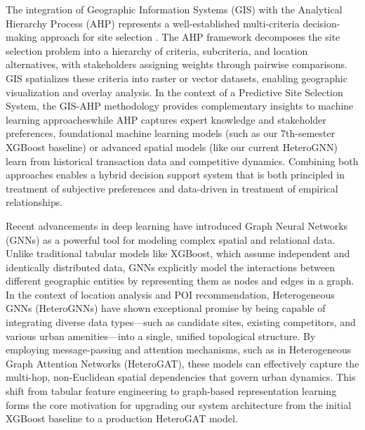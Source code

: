 \par The integration of Geographic Information Systems (GIS) with the Analytical Hierarchy Process (AHP) represents a well-established multi-criteria decision-making approach for site selection \citep{doe2023gis}. The AHP framework decomposes the site selection problem into a hierarchy of criteria, subcriteria, and location alternatives, with stakeholders assigning weights through pairwise comparisons. GIS spatializes these criteria into raster or vector datasets, enabling geographic visualization and overlay analysis. In the context of a Predictive Site Selection System, the GIS-AHP methodology provides complementary insights to machine learning approacheswhile AHP captures expert knowledge and stakeholder preferences, foundational machine learning models (such as our 7th-semester XGBoost baseline) or advanced spatial models (like our current HeteroGNN) learn from historical transaction data and competitive dynamics. Combining both approaches enables a hybrid decision support system that is both principled in treatment of subjective preferences and data-driven in treatment of empirical relationships.

\par Recent advancements in deep learning have introduced Graph Neural Networks (GNNs) as a powerful tool for modeling complex spatial and relational data. Unlike traditional tabular models like XGBoost, which assume independent and identically distributed data, GNNs explicitly model the interactions between different geographic entities by representing them as nodes and edges in a graph. In the context of location analysis and POI recommendation, Heterogeneous GNNs (HeteroGNNs) have shown exceptional promise by being capable of integrating diverse data types—such as candidate sites, existing competitors, and various urban amenities—into a single, unified topological structure. By employing message-passing and attention mechanisms, such as in Heterogeneous Graph Attention Networks (HeteroGAT), these models can effectively capture the multi-hop, non-Euclidean spatial dependencies that govern urban dynamics. This shift from tabular feature engineering to graph-based representation learning forms the core motivation for upgrading our system architecture from the initial XGBoost baseline to a production HeteroGAT model.

